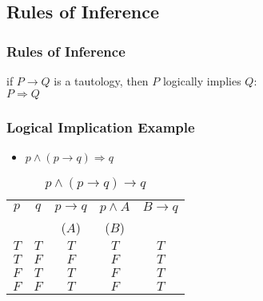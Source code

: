 \documentclass[dvipsnames]{beamer}
\begin{document}
\subsection{Rules of Inference}

\begin{frame}
  \frametitle{Rules of Inference}

  \begin{definition}
    if $P \rightarrow Q$ is a tautology, then $P$ \alert{logically implies} $Q$:\\
    $P \Rightarrow Q$
  \end{definition}
\end{frame}

\begin{frame}
  \frametitle{Logical Implication Example}

  \begin{example}
    \begin{itemize}
      \item $p \wedge (p \rightarrow q) \Rightarrow q$
    \end{itemize}

    \begin{table}
      \caption{$p \wedge (p \rightarrow q) \rightarrow q$}
      \begin{tabular}{|c|c|c|c||c|}\hline
        $p$ & $q$ & $p \rightarrow q$ & $p \wedge A$ & $B \rightarrow q$\\
            &     & ($A$)             & ($B$)        &\\\hline\hline
        $T$ & $T$ & $T$ & $T$ & $T$\\\hline
        $T$ & $F$ & $F$ & $F$ & $T$\\\hline
        $F$ & $T$ & $T$ & $F$ & $T$\\\hline
        $F$ & $F$ & $T$ & $F$ & $T$\\\hline
      \end{tabular}
    \end{table}
  \end{example}
\end{frame}
\end{document}
